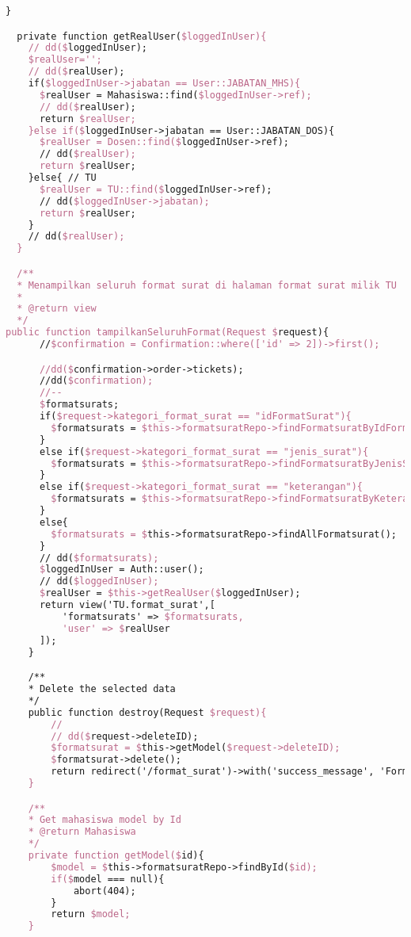 \begin{lstlisting}[language=tex,basicstyle=\tiny,caption=FormatsuratController.php]
	}

  private function getRealUser($loggedInUser){
    // dd($loggedInUser);
    $realUser='';
    // dd($realUser);
    if($loggedInUser->jabatan == User::JABATAN_MHS){
      $realUser = Mahasiswa::find($loggedInUser->ref);
      // dd($realUser);
      return $realUser;
    }else if($loggedInUser->jabatan == User::JABATAN_DOS){
      $realUser = Dosen::find($loggedInUser->ref);
      // dd($realUser);
      return $realUser;
    }else{ // TU
      $realUser = TU::find($loggedInUser->ref);
      // dd($loggedInUser->jabatan);
      return $realUser;
    }
    // dd($realUser);
  }

  /**
  * Menampilkan seluruh format surat di halaman format surat milik TU
  *
  * @return view
  */
public function tampilkanSeluruhFormat(Request $request){
      //$confirmation = Confirmation::where(['id' => 2])->first();

      //dd($confirmation->order->tickets);
      //dd($confirmation);
      //--
      $formatsurats;
      if($request->kategori_format_surat == "idFormatSurat"){
        $formatsurats = $this->formatsuratRepo->findFormatsuratByIdFormatSurat($request->searchBox_format_surat);
      }
      else if($request->kategori_format_surat == "jenis_surat"){
        $formatsurats = $this->formatsuratRepo->findFormatsuratByJenisSurat($request->searchBox_format_surat);
      }
      else if($request->kategori_format_surat == "keterangan"){
        $formatsurats = $this->formatsuratRepo->findFormatsuratByKeteranganSurat($request->searchBox_format_surat);
      }
      else{
        $formatsurats = $this->formatsuratRepo->findAllFormatsurat();
      }
      // dd($formatsurats);
      $loggedInUser = Auth::user();
      // dd($loggedInUser);
      $realUser = $this->getRealUser($loggedInUser);
      return view('TU.format_surat',[
          'formatsurats' => $formatsurats,
          'user' => $realUser
      ]);
    }

    /**
    * Delete the selected data
    */
    public function destroy(Request $request){
        //
        // dd($request->deleteID);
        $formatsurat = $this->getModel($request->deleteID);
        $formatsurat->delete();
        return redirect('/format_surat')->with('success_message', 'Format surat <b>#' . $request->id . '</b> berhasil dihapus.');
    }

    /**
    * Get mahasiswa model by Id
    * @return Mahasiswa
    */
    private function getModel($id){
        $model = $this->formatsuratRepo->findById($id);
        if($model === null){
            abort(404);
        }
        return $model;
    }


\end{lstlisting}

